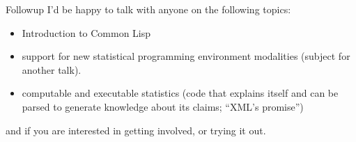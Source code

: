 \documentclass{beamer}
\begin{document}
\begin{frame}{Followup}
  I'd be happy to talk with anyone on the following topics:
  \begin{itemize}
  \item Introduction to Common Lisp
  \item support for new statistical programming environment modalities
    (subject for another talk).
  \item computable and executable statistics (code that explains
    itself and can be parsed to generate knowledge about its claims;
    ``XML's promise'')
  \end{itemize}
  and if you are interested in getting involved, or trying it out.
\end{frame}
\end{document}
